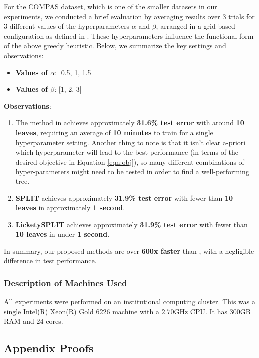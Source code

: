 For the COMPAS dataset, which is one of the smaller datasets in our experiments, we conducted a brief evaluation by averaging results over $3$ trials for $3$ different values of the hyperparameters $\alpha$ and $\beta$, arranged in a grid-based configuration as defined in \cite{slow_greedy}. These hyperparameters influence the functional form of the above greedy heuristic. Below, we summarize the key settings and observations:
\begin{itemize}
    \item \textbf{Values of $\alpha$}: [0.5, 1, 1.5]
    \item \textbf{Values of $\beta$}: [1, 2, 3]
\end{itemize}
\textbf{Observations}:
\begin{enumerate}
    \item The method in \cite{slow_greedy} achieves approximately \textbf{31.6\% test error} with around \textbf{10 leaves}, requiring an average of \textbf{10 minutes} to train for a single hyperparameter setting. Another thing to note is that it isn't clear a-priori which hyperparameter will lead to the best performance (in terms of the desired objective in Equation \ref{eqn:obj}), so many different combinations of hyper-parameters might need to be tested in order to find a well-performing tree.
    \item \textbf{SPLIT} achieves approximately \textbf{31.9\% test error} with fewer than \textbf{10 leaves} in approximately \textbf{1 second}.
    \item \textbf{LicketySPLIT} achieves approximately \textbf{31.9\% test error} with fewer than \textbf{10 leaves} in under \textbf{1 second}.
\end{enumerate}
In summary, our proposed methods are over \textbf{600x faster} than \cite{slow_greedy}, with a negligible difference in test performance.
\subsubsection{Description of Machines Used}
All experiments were performed on an institutional computing cluster. This was a single Intel(R) Xeon(R) Gold 6226 machine with a $2.70$GHz CPU. It has $300$GB RAM and $24$ cores. 


\label{sec:setup}

\subsection{Appendix Proofs}
\label{sec:proofs}

\newpage

